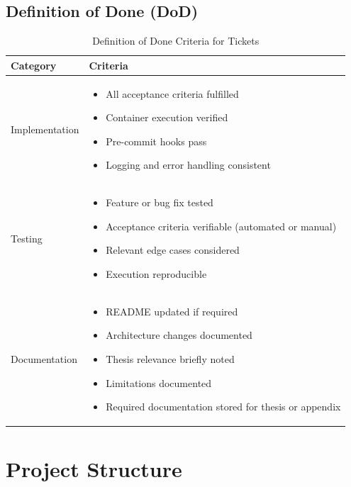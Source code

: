 \subsection{Definition of Done (DoD)}\label{subsec:definition-of-done}
\begin{table}[H]
	\centering
	\begin{tabularx}{\textwidth}{lX}
		\toprule
		\textbf{Category} & \textbf{Criteria} \\
		\midrule
		Implementation &
		\begin{itemize}
			\item All acceptance criteria fulfilled
			\item Container execution verified
			\item Pre-commit hooks pass
			\item Logging and error handling consistent
		\end{itemize} \\

		Testing &
		\begin{itemize}
			\item Feature or bug fix tested
			\item Acceptance criteria verifiable (automated or manual)
			\item Relevant edge cases considered
			\item Execution reproducible
		\end{itemize} \\

		Documentation &
		\begin{itemize}
			\item README updated if required
			\item Architecture changes documented
			\item Thesis relevance briefly noted
			\item Limitations documented
			\item Required documentation stored for thesis or appendix
		\end{itemize} \\
		\bottomrule
	\end{tabularx}
	\caption{Definition of Done Criteria for Tickets}
	\label{tab:definition-of-done}
\end{table}

\section{Project Structure}\label{sec:project-structure}

